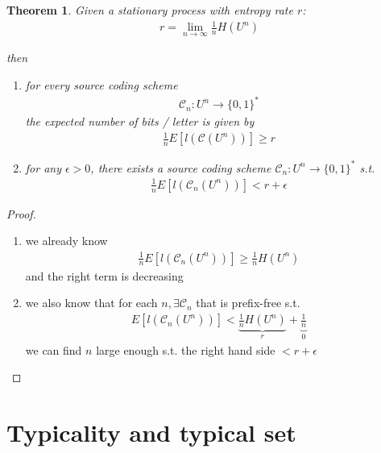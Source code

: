 \documentclass{article}
\newtheorem{theorem}{Theorem}[section]
\theoremstyle{definition} %
\def\C{\mathscr{C}}
\begin{document}

\begin{theorem}
  Given a stationary process with entropy rate $r$:
  \begin{align*}
    r = \lim_{n \rightarrow \infty} \frac{1}{n} H(U^n)
  \end{align*}

  then
  \begin{enumerate}
    \item for every source coding scheme
    \begin{align*}
      \C_n: U^n \rightarrow \{0, 1\}^*
    \end{align*}
    the expected number of bits / letter is given by
    \begin{align*}
      \frac{1}{n} E[l(\C(U^n))] \geq r
    \end{align*}
    \item for any $\epsilon > 0$, there exists a source coding scheme $\C_n: U^n \rightarrow \{0, 1\}^*$ s.t.
    \begin{align*}
      \frac{1}{n} E[l(\C_n(U^n))] < r + \epsilon
    \end{align*}
  \end{enumerate}
\end{theorem}

\begin{proof}
  \begin{enumerate}
    \item we already know
    \begin{align*}
      \frac{1}{n} E[l(\C_n(U^n))] \geq \frac{1}{n} H(U^n)
    \end{align*}
    and the right term is decreasing
    \item we also know that for each $n, \exists \C_n$ that is prefix-free s.t.
    \begin{align*}
      E[l(\C_n(U^n))] < \underbrace{\frac{1}{n} H(U^n)}_{r} + \underbrace{\frac{1}{n}}_{0}
    \end{align*}
    we can find $n$ large enough s.t. the right hand side $< r + \epsilon$
  \end{enumerate}
\end{proof}


\section{Typicality and typical set}
\end{document}
